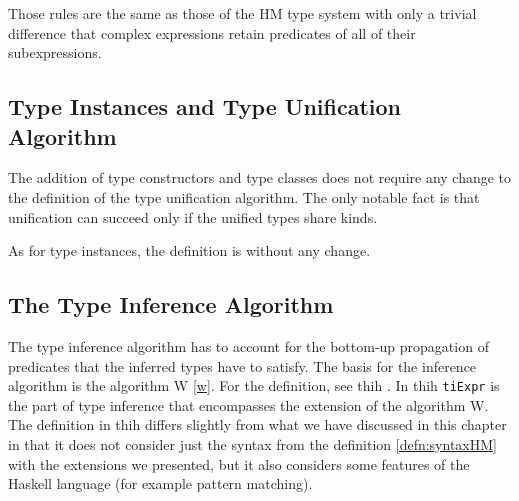 Those rules are the same as those of the HM type system with only a trivial difference that complex expressions retain predicates of all of their subexpressions.


\subsection{Type Instances and Type Unification Algorithm}

The addition of type constructors and type classes does not require any change to the definition of the type unification algorithm. The only notable fact is that unification can succeed only if the unified types share kinds.

As for type instances, the definition is without any change.

\subsection{The Type Inference Algorithm}

The type inference algorithm has to account for the bottom-up propagation of predicates that the inferred types have to satisfy. The basis for the inference algorithm is the algorithm W \ref{w}. For the definition, see thih \cite{jones1999typing}. In thih \lstinline[language=haskell]{tiExpr} is the part of type inference that encompasses the extension of the algorithm W. The definition in thih differs slightly from what we have discussed in this chapter in that it does not consider just the syntax from the definition \ref{defn:syntaxHM} with the extensions we presented, but it also considers some features of the Haskell language (for example pattern matching).
